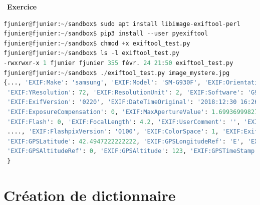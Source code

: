 \documentclass[
  11pt,
]{article}
\newcounter{exo}
\newenvironment{exercice}[1]
{\par \medskip   \addtocounter{exo}{1} \noindent  
\begin{bclogo}[arrondi =0.1,   noborder = true, logo=\bccrayon, marge=4]{~\textbf{Exercice} \textbf{\theexo} {\itshape #1} }  \par}
{
\end{bclogo}
 \par \bigskip }
\begin{document}
\begin{exercice}{}
\begin{lstlisting}[language=Python]
fjunier@fjunier:~/sandbox$ sudo apt install libimage-exiftool-perl
fjunier@fjunier:~/sandbox$ pip3 install --user pyexiftool
fjunier@fjunier:~/sandbox$ chmod +x exiftool_test.py 
fjunier@fjunier:~/sandbox$ ls -l exiftool_test.py 
-rwxrwxr-x 1 fjunier fjunier 355 févr. 24 21:50 exiftool_test.py
fjunier@fjunier:~/sandbox$ ./exiftool_test.py image_mystere.jpg 
{..., 'EXIF:Make': 'samsung', 'EXIF:Model': 'SM-G930F', 'EXIF:Orientation': 1, 'EXIF:XResolution': 72,
 'EXIF:YResolution': 72, 'EXIF:ResolutionUnit': 2, 'EXIF:Software': 'G930FXXU3ERL3', 'EXIF:ModifyDate': '2018:12:30 16:26:24', 'EXIF:YCbCrPositioning': 1, 'EXIF:ExposureTime': 0.0005733944954, 'EXIF:FNumber': 1.7, 'EXIF:ExposureProgram': 2, 'EXIF:ISO': 50,
 'EXIF:ExifVersion': '0220', 'EXIF:DateTimeOriginal': '2018:12:30 16:26:24', 'EXIF:CreateDate': '2018:12:30 16:26:24', 'EXIF:ComponentsConfiguration': '1 2 3 0', 'EXIF:ShutterSpeedValue': '0.000572673315054629', 'EXIF:ApertureValue': 1.6993699982773, 'EXIF:BrightnessValue': 8.36,
 'EXIF:ExposureCompensation': 0, 'EXIF:MaxApertureValue': 1.6993699982773, 'EXIF:MeteringMode': 2,
 'EXIF:Flash': 0, 'EXIF:FocalLength': 4.2, 'EXIF:UserComment': '', 'EXIF:SubSecTime': '0999',
 ...., 'EXIF:FlashpixVersion': '0100', 'EXIF:ColorSpace': 1, 'EXIF:ExifImageWidth': 4032, 'EXIF:ExifImageHeight': 3024, ..., 'EXIF:GPSVersionID': '2 2 0 0', 'EXIF:GPSLatitudeRef': 'N',
 'EXIF:GPSLatitude': 42.4947222222222, 'EXIF:GPSLongitudeRef': 'E', 'EXIF:GPSLongitude': 3.13,
 'EXIF:GPSAltitudeRef': 0, 'EXIF:GPSAltitude': 123, 'EXIF:GPSTimeStamp': '15:26:35','EXIF:GPSDateStamp': '2018:12:30', ....
 }
\end{lstlisting}

\end{exercice}

\hypertarget{cruxe9ation-de-dictionnaire}{%
\section{Création de dictionnaire}\label{cruxe9ation-de-dictionnaire}}
\end{document}

